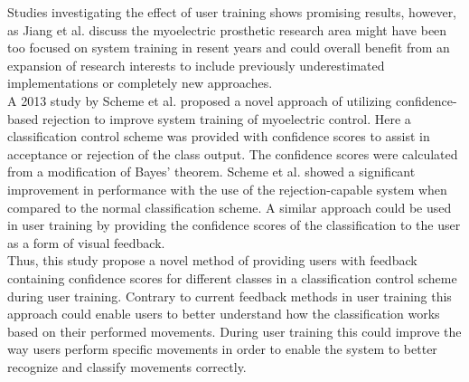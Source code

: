 Studies investigating the effect of user training shows promising results, however, as Jiang et al. \cite{Jiang2012} discuss the myoelectric prosthetic research area might have been too focused on system training in resent years and could overall benefit from an expansion of research interests to include previously underestimated implementations or completely new approaches. \\
A 2013 study by Scheme et al. \cite{Scheme2013} proposed a novel approach of utilizing confidence-based rejection to improve system training of myoelectric control. Here a classification control scheme was provided with confidence scores to assist in acceptance or rejection of the class output. The confidence scores were calculated from a modification of Bayes' theorem. Scheme et al. \cite{Scheme2013} showed a significant improvement in performance with the use of the rejection-capable system when compared to the normal classification scheme. A similar approach could be used in user training by providing the confidence scores of the classification to the user as a form of visual feedback. \\
Thus, this study propose a novel method of providing users with feedback containing confidence scores for different classes in a classification control scheme during user training. Contrary to current feedback methods in user training this approach could enable users to better understand how the classification works based on their performed movements. During user training this could improve the way users perform specific movements in order to enable the system to better recognize and classify movements correctly.






 
 
